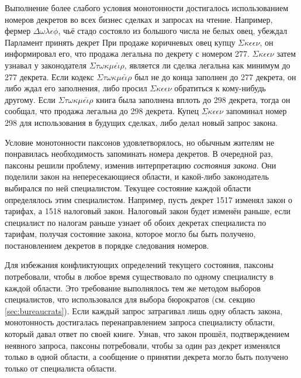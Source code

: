 \documentclass[12pt, a4paper]{article} %
\begin{document}
Выполнение более слабого условия монотонности достигалось использованием номеров декретов во всех бизнес сделках и запросах на чтение. Например, фермер $\Delta\omega\lambda\epsilon\phi$, чьё стадо состояло из большого числа не белых овец, убеждал Парламент принять декрет
При продаже коричневых овец купцу $\Sigma\kappa\epsilon\epsilon\nu$, он информировал его, что продажа легальна по декрету с номером 277. $\Sigma\kappa\epsilon\epsilon\nu$ затем узнавал у законодателя $\Sigma\tau\omega\kappa\mu\epsilon\check{\iota}\rho$, является ли сделка легальна как минимум до 277 декрета. Если кодекс $\Sigma\tau\omega\kappa\mu\epsilon\check{\iota}\rho$ был не до конца заполнен до 277 декрета, он либо ждал его заполнения, либо просил  $\Sigma\kappa\epsilon\epsilon\nu$ обратиться к кому-нибудь другому. Если  $\Sigma\tau\omega\kappa\mu\epsilon\check{\iota}\rho$ книга была заполнена вплоть до 298 декрета, тогда он сообщал, что продажа легальна до 298 декрета. Купец $\Sigma\kappa\epsilon\epsilon\nu$ запоминал номер 298 для использования в будущих сделках, либо делал новый запрос закона.

Условие монотонности паксонов удовлетворялось, но обычным жителям не понравилась необходимость запоминать номера декретов. В очередной раз, паксоны решили проблему, изменив интерпретацию \textit{состояния закона}. Они поделили закон на непересекающиеся области, и какой-либо законодатель выбирался по ней специалистом. Текущее состояние каждой области определялось этим специалистом. Например, пусть декрет 1517 изменял закон о тарифах, а 1518 налоговый закон. Налоговый закон будет изменён раньше, если специалист по налогам раньше узнает об обоих декретах специалиста по тарифам, получая состояние закона, которое могло бы быть получено, постановлением декретов в порядке следования номеров.

Для избежания конфликтующих определений текущего состояния, паксоны потребовали, чтобы в любое время существовало по одному специалисту в каждой области. Это требование выполнялось тем же методом выборов специалистов, что использовался для выбора бюрократов (см. секцию \ref{sec:bureaucrats}). Если каждый запрос затрагивал лишь одну область закона, монотонность достигалась перенаправлением запроса специалисту области, который давал ответ по своей книге. Узнав, что закон прошёл, подтверждением неявного запроса, паксоны потребовали, чтобы за один раз декрет изменялся только в одной области, а сообщение о принятии декрета могло быть получено только от специалиста области.
\end{document}
